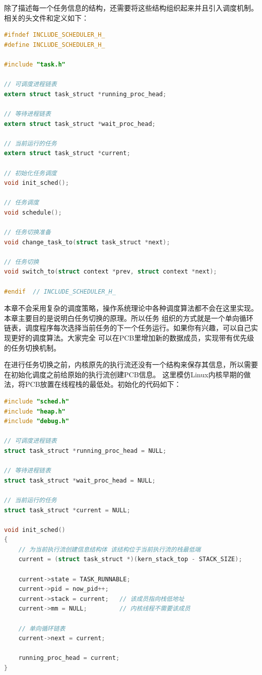 \par 除了描述每一个任务信息的结构，还需要将这些结构组织起来并且引入调度机制。相关的头文件和定义如下：

\begin{lstlisting}[language = C, caption = include/sched.h]
#ifndef INCLUDE_SCHEDULER_H_
#define INCLUDE_SCHEDULER_H_

#include "task.h"

// 可调度进程链表
extern struct task_struct *running_proc_head;

// 等待进程链表
extern struct task_struct *wait_proc_head;

// 当前运行的任务
extern struct task_struct *current;

// 初始化任务调度
void init_sched();

// 任务调度
void schedule();

// 任务切换准备
void change_task_to(struct task_struct *next);

// 任务切换
void switch_to(struct context *prev, struct context *next);

#endif 	// INCLUDE_SCHEDULER_H_
\end{lstlisting}

\par 本章不会采用复杂的调度策略，操作系统理论中各种调度算法都不会在这里实现。本章主要目的是说明白任务切换的原理。所以任务\allowbreak
组织的方式就是一个单向循环链表，调度程序每次选择当前任务的下一个任务运行。如果你有兴趣，可以自己实现更好的调度算法。大家完全\allowbreak
可以在PCB里增加新的数据成员，实现带有优先级的任务切换机制。

\par 在进行任务切换之前，内核原先的执行流还没有一个结构来保存其信息，所以需要在初始化调度之前给原始的执行流创建PCB信息。\allowbreak
这里模仿Linux内核早期的做法，将PCB放置在线程栈的最低处。初始化的代码如下：

\begin{lstlisting}[language = C, caption = kernel/sched/sched.c]
#include "sched.h"
#include "heap.h"
#include "debug.h"

// 可调度进程链表
struct task_struct *running_proc_head = NULL;

// 等待进程链表
struct task_struct *wait_proc_head = NULL;

// 当前运行的任务
struct task_struct *current = NULL;

void init_sched()
{
	// 为当前执行流创建信息结构体 该结构位于当前执行流的栈最低端
	current = (struct task_struct *)(kern_stack_top - STACK_SIZE);

	current->state = TASK_RUNNABLE;
	current->pid = now_pid++;
	current->stack = current; 	// 该成员指向栈低地址
	current->mm = NULL; 		// 内核线程不需要该成员

	// 单向循环链表
	current->next = current;

	running_proc_head = current;
}
\end{lstlisting}

